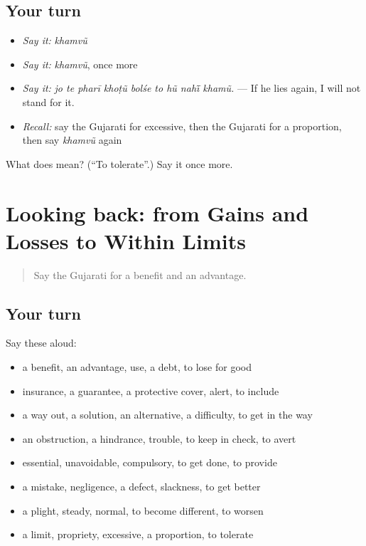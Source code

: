 \subsection*{Your turn}
\begin{itemize}
\raggedright
  \item \emph{Say it:} \emph{khamvũ}
  \item \emph{Say it:} \emph{khamvũ}, once more
  \item \emph{Say it:} \emph{jo te pharī khoṭũ bolśe to hũ nahī̃ khamũ.} — If he lies again, I will not stand for it.
  \item \emph{Recall:} say the Gujarati for excessive, then the Gujarati for a proportion, then say \emph{khamvũ} again
\end{itemize}

\begin{tcolorbox}[breakable,colback=teal!4,colframe=teal!35!black,title={Before you move on}]
What does  mean? (\textquotedblleft{}To tolerate\textquotedblright{}.) Say it once more.
\end{tcolorbox}
\section[(dialogue)]{Looking back: from Gains and Losses to Within Limits}

\label{lesson:GU-R378-review-371-378}



\begin{quote}
Say the Gujarati for a benefit and an advantage.
\end{quote}

\subsection*{Your turn}
Say these aloud:

\begin{itemize}
\raggedright
  \item a benefit, an advantage, use, a debt, to lose for good
  \item insurance, a guarantee, a protective cover, alert, to include
  \item a way out, a solution, an alternative, a difficulty, to get in the way
  \item an obstruction, a hindrance, trouble, to keep in check, to avert
  \item essential, unavoidable, compulsory, to get done, to provide
  \item a mistake, negligence, a defect, slackness, to get better
  \item a plight, steady, normal, to become different, to worsen
  \item a limit, propriety, excessive, a proportion, to tolerate
\end{itemize}

